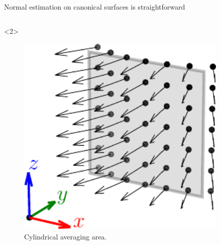 \documentclass[xcolor=dvipsnames,10pt]{beamer}
\begin{document}
\begin{frame}{Normal estimation on canonical surfaces is straightforward}
\begin{columns}[c]
\begin{column}{0.3\textwidth}
            \begin{onlyenv}<2>
            \begin{center}
                \begin{figure}
                    \includegraphics[width=0.9\textwidth]{figures/eval_cylindrical.pdf}
                    \caption{Cylindrical averaging area.}
                \end{figure}
            \end{center}
            \end{onlyenv}
        \end{column}
    \end{columns}
\end{frame}
\end{document}
